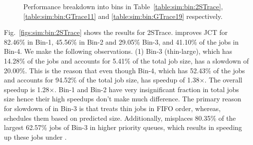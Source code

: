 \begin{figure}[tp]
\vspace{-0.1in}
\hspace{-0.25in}
\hspace{-0.25in}
\vspace{-0.15in}
\caption{Performance breakdown into bins in Table~\ref{table:sim:bin:2STrace}, \ref{table:sim:bin:GTrace11} and \ref{table:sim:bin:GTrace19} respectively.}
\vspace{-0.20in}
\label{figs:sim:bin}
\end{figure}


Fig.~\ref{figs:sim:bin:2STrace} shows the results for 2STrace.  \slearn improves JCT
for 82.46\% in Bin-1, 45.56\% in Bin-2 and 29.05\% Bin-3,
and 41.10\%  of the jobs in Bin-4.
We make the following observations.
(1) Bin-3 (thin-large), which has 14.28\% of the jobs and accounts for 5.41\% of the total
job size, has a slowdown of 20.00\%. This is the reason that even though Bin-4,
which has 52.43\% of the jobs and accounts for 94.52\% of the total job size,
has speedup of 1.38$\times$. The overall speedup is 1.28$\times$.  Bin-1 and
Bin-2 have very insignificant fraction in total jobs size hence their high
speedups don't make much difference. The primary reason for slowdown of
\slearn in Bin-3 is that \slearn treats thin jobs in FIFO order, whereas,
\primarybase schedules them based on predicted size. Additionally, \primarybase
misplaces 80.35\% of the largest 62.57\% jobs of Bin-3 in higher priority
queues, which results in speeding up these jobs under \primarybase. 

